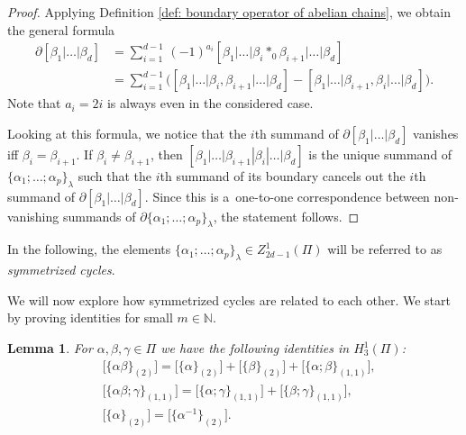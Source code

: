 \documentclass[pdftex]{sigma}
\numberwithin{equation}{section}
\newtheorem{Lemma}[Theorem]{Lemma}
\newcommand{\NN }{\mathbb{N}}
\begin{document}
\begin{proof}
 Applying Definition \ref{def: boundary operator of abelian chains}, we obtain the general formula{\samepage
 \begin{align*}
 \partial [\beta_1|\dots| \beta_d] &= \sum_{i=1}^{d-1}\,(-1)^{a_i}[\beta_1|\dots|\beta_i \ast_0 \beta_{i+1} | \dots | \beta_d] \\
 &= \sum_{i=1}^{d-1}\big([\beta_1|\dots|\beta_i, \beta_{i+1} | \dots | \beta_d] - [\beta_1|\dots|\beta_{i+1}, \beta_i | \dots | \beta_d] \big).
 \end{align*}
 Note that $a_i=2i$ is always even in the considered case.}

 Looking at this formula, we notice that the $i$th summand of $\partial [\beta_1|\dots| \beta_d]$ vanishes iff $\beta_i=\beta_{i+1}$. If $\beta_i \neq \beta_{i+1}$, then $[\beta_1|\dots|\beta_{i+1}|\beta_i| \dots | \beta_d]$ is the unique summand of $\{\alpha_1;\dots ;\alpha_p\}_\lambda$ such that the $i$th summand of its boundary cancels out the $i$th summand of $\partial [\beta_1|\dots| \beta_d]$. Since this is a~one-to-one correspondence between non-vanishing summands of $\partial \{\alpha_1;\dots ;\alpha_p\}_\lambda$, the statement follows.
\end{proof}

In the following, the elements $\{\alpha_1;\dots ;\alpha_p\}_\lambda \in Z_{2d-1}^1(\Pi)$ will be referred to as {\it symmetrized cycles}.

We will now explore how symmetrized cycles are related to each other. We start by proving identities for small $m \in \NN$.

\begin{Lemma}
 For $\alpha,\beta,\gamma \in \Pi$ we have the following identities in $H_{3}^1(\Pi)$:
 \begin{align*}
 &\big[\{\alpha\beta\}_{(2)} \big]=\big[\{\alpha\}_{(2)}\big]+\big[\{\beta\}_{(2)}\big]+\big[\{\alpha;\beta\}_{(1,1)}\big],\\
& \big[\{\alpha\beta;\gamma\}_{(1,1)}\big]=\big[\{\alpha;\gamma\}_{(1,1)}\big]+\big[\{\beta;\gamma\}_{(1,1)}\big],\\
 &\big[\{\alpha\}_{(2)}\big]=\big[\big\{\alpha^{-1}\big\}_{(2)}\big].
 \end{align*}
\end{Lemma}
\end{document}
